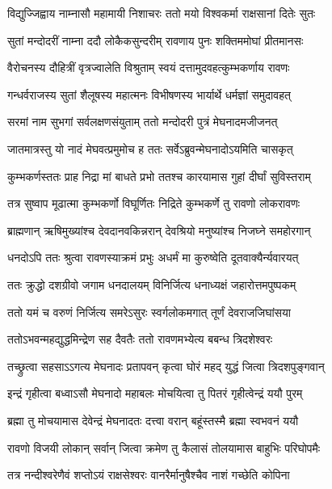 \twolineshloka
{विद्युज्जिह्वाय नाम्नासौ महामायी निशाचरः}
{ततो मयो विश्वकर्मा राक्षसानां दितेः सुतः} %

\twolineshloka
{सुतां मन्दोदरीं नाम्ना ददौ लोकैकसुन्दरीम्}
{रावणाय पुनः शक्तिममोघां प्रीतमानसः} %

\twolineshloka
{वैरोचनस्य दौहित्रीं वृत्रज्वालेति विश्रुताम्}
{स्वयं दत्तामुदवहत्कुम्भकर्णाय रावणः} %

\twolineshloka
{गन्धर्वराजस्य सुतां शैलूषस्य महात्मनः}
{विभीषणस्य भार्यार्थे धर्मज्ञां समुदावहत्} %

\twolineshloka
{सरमां नाम सुभगां सर्वलक्षणसंयुताम्}
{ततो मन्दोदरी पुत्रं मेघनादमजीजनत्} %

\twolineshloka
{जातमात्रस्तु यो नादं मेघवत्प्रमुमोच ह}
{ततः सर्वेऽब्रुवन्मेघनादोऽयमिति चासकृत्} %

\twolineshloka
{कुम्भकर्णस्ततः प्राह निद्रा मां बाधते प्रभो}
{ततश्च कारयामास गुहां दीर्घां सुविस्तराम्} %

\twolineshloka
{तत्र सुष्वाप मूढात्मा कुम्भकर्णो विघूर्णितः}
{निद्रिते कुम्भकर्णे तु रावणो लोकरावणः} %

\twolineshloka
{ब्राह्मणान् ऋषिमुख्यांश्च देवदानवकिन्नरान्}
{देवश्रियो मनुष्यांश्च निजघ्ने समहोरगान्} %

\twolineshloka
{धनदोऽपि ततः श्रुत्वा रावणस्याक्रमं प्रभुः}
{अधर्मं मा कुरुष्वेति दूतवाक्यैर्न्यवारयत्} %

\twolineshloka
{ततः क्रुद्धो दशग्रीवो जगाम धनदालयम्}
{विनिर्जित्य धनाध्यक्षं जहारोत्तमपुष्पकम्} %

\twolineshloka
{ततो यमं च वरुणं निर्जित्य समरेऽसुरः}
{स्वर्गलोकमगात् तूर्णं देवराजजिघांसया} %

\twolineshloka
{ततोऽभवन्महद्युद्धमिन्द्रेण सह दैवतैः}
{ततो रावणमभ्येत्य बबन्ध त्रिदशेश्वरः} %

\twolineshloka
{तच्छ्रुत्वा सहसाऽऽगत्य मेघनादः प्रतापवन्}
{कृत्वा घोरं महद् युद्धं जित्वा त्रिदशपुङ्गवान्} %

\twolineshloka
{इन्द्रं गृहीत्वा बध्वाऽसौ मेघनादो महाबलः}
{मोचयित्वा तु पितरं गृहीत्वेन्द्रं ययौ पुरम्} %

\twolineshloka
{ब्रह्मा तु मोचयामास देवेन्द्रं मेघनादतः}
{दत्त्वा वरान् बहूंस्तस्मै ब्रह्मा स्वभवनं ययौ} %

\twolineshloka
{रावणो विजयी लोकान् सर्वान् जित्वा क्रमेण तु}
{कैलासं तोलयामास बाहुभिः परिघोपमैः} %

\twolineshloka
{तत्र नन्दीश्वरेणैवं शप्तोऽयं राक्षसेश्वरः}
{वानरैर्मानुषैश्चैव नाशं गच्छेति कोपिना} %

